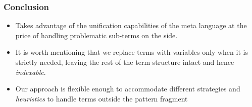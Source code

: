 \documentclass{pres}
\begin{document}
\begin{frame}
  \frametitle{Conclusion}

  \begin{itemize}
    \item Takes advantage of the unification capabilities of the meta language
          at the price of handling problematic sub-terms on the side.
    \item It is worth mentioning that we replace terms with variables only when
          it is strictly needed, leaving the rest of the term structure intact
          and hence \emph{indexable}.
    \item Our approach is flexible enough to accommodate different strategies
          and \emph{heuristics} to handle terms outside the pattern fragment
  \end{itemize}

\end{frame}
\end{document}
